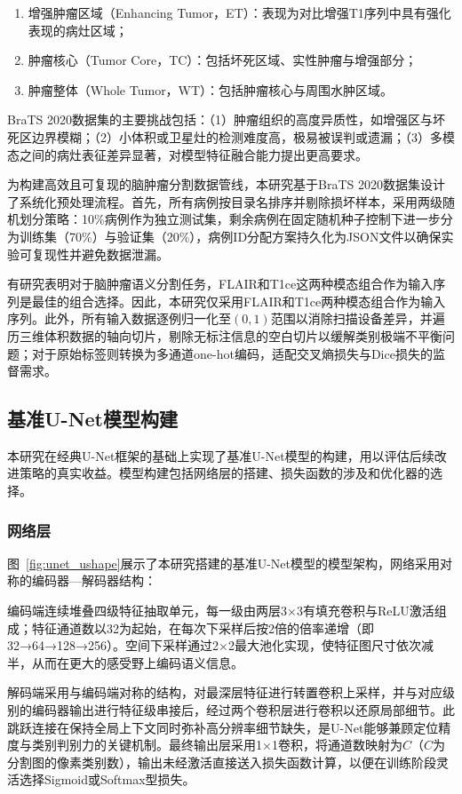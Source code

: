 \begin{enumerate}
    \item 增强肿瘤区域（Enhancing Tumor，ET）：表现为对比增强T1序列中具有强化表现的病灶区域；
    \item 肿瘤核心（Tumor Core，TC）：包括坏死区域、实性肿瘤与增强部分；
    \item 肿瘤整体（Whole Tumor，WT）：包括肿瘤核心与周围水肿区域。
\end{enumerate}

BraTS 2020数据集的主要挑战包括：（1）肿瘤组织的高度异质性，如增强区与坏死区边界模糊；（2）小体积或卫星灶的检测难度高，极易被误判或遗漏；（3）多模态之间的病灶表征差异显著，对模型特征融合能力提出更高要求。

为构建高效且可复现的脑肿瘤分割数据管线，本研究基于BraTS 2020数据集设计了系统化预处理流程。首先，所有病例按目录名排序并剔除损坏样本，采用两级随机划分策略：10\%病例作为独立测试集，剩余病例在固定随机种子控制下进一步分为训练集（70\%）与验证集（20\%），病例ID分配方案持久化为JSON文件以确保实验可复现性并避免数据泄漏。

有研究表明对于脑肿瘤语义分割任务，FLAIR和T1ce这两种模态组合作为输入序列是最佳的组合选择\cite{buchner2023}。因此，本研究仅采用FLAIR和T1ce两种模态组合作为输入序列。此外，所有输入数据逐例归一化至$(0,1)$范围以消除扫描设备差异，并遍历三维体积数据的轴向切片，剔除无标注信息的空白切片以缓解类别极端不平衡问题；对于原始标签则转换为多通道one-hot编码，适配交叉熵损失与Dice损失的监督需求。

\subsection{基准U-Net模型构建}

本研究在经典U-Net框架的基础上实现了基准U-Net模型的构建，用以评估后续改进策略的真实收益。模型构建包括网络层的搭建、损失函数的涉及和优化器的选择。

\subsubsection{网络层}

图~\ref{fig:unet_ushape}展示了本研究搭建的基准U-Net模型的模型架构，网络采用对称的编码器—解码器结构：

编码端连续堆叠四级特征抽取单元，每一级由两层3×3有填充卷积与ReLU激活组成；特征通道数以32为起始，在每次下采样后按2倍的倍率递增（即32→64→128→256）。空间下采样通过2×2最大池化实现，使特征图尺寸依次减半，从而在更大的感受野上编码语义信息。

解码端采用与编码端对称的结构，对最深层特征进行转置卷积上采样，并与对应级别的编码器输出进行特征级串接后，经过两个卷积层进行卷积以还原局部细节。此跳跃连接在保持全局上下文同时弥补高分辨率细节缺失，是U-Net能够兼顾定位精度与类别判别力的关键机制。最终输出层采用1×1卷积，将通道数映射为$C$（$C$为分割图的像素类别数），输出未经激活直接送入损失函数计算，以便在训练阶段灵活选择Sigmoid或Softmax型损失。

